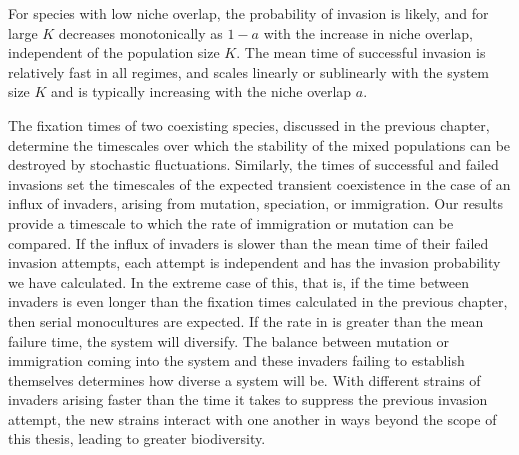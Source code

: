 For species with low niche overlap, the probability of invasion is likely, and for large $K$ decreases monotonically as $1-a$ with the increase in niche overlap, independent of the population size $K$. 
The mean time of successful invasion is relatively fast in all regimes, and scales linearly or sublinearly with the system size $K$ and is typically increasing with the niche overlap $a$.


The fixation times of two coexisting species, discussed in the previous chapter, determine the timescales over which the stability of the mixed populations can be destroyed by stochastic fluctuations. 
Similarly, the times of successful and failed invasions set the timescales of the expected transient coexistence in the case of an influx of invaders, arising from mutation, speciation, or immigration. 
Our results provide a timescale to which the rate of immigration or mutation can be compared. 
If the influx of invaders is slower than the mean time of their failed invasion attempts, each attempt is independent and has the invasion probability we have calculated. 
In the extreme case of this, that is, if the time between invaders is even longer than the fixation times calculated in the previous chapter, then serial monocultures are expected.
If the rate in is greater than the mean failure time, the system will diversify. 
The balance between mutation or immigration coming into the system and these invaders failing to establish themselves determines how diverse a system will be. %
With different strains of invaders arising faster than the time it takes to suppress the previous invasion attempt, the new strains interact with one another in ways beyond the scope of this thesis, leading to greater biodiversity. 


